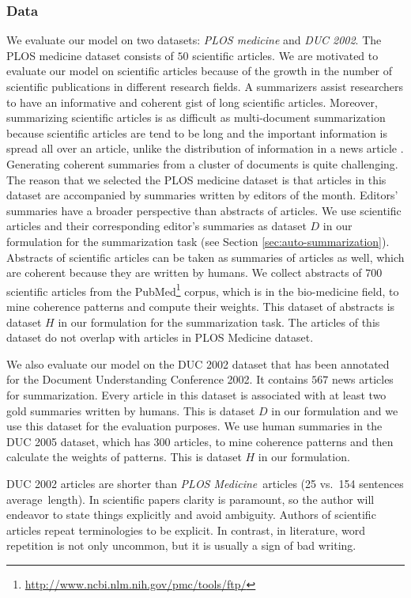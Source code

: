 \subsubsection{Data}
We evaluate our model on two datasets:  \emph{PLOS medicine} and \emph{DUC 2002}. 
The PLOS medicine dataset consists of $50$ scientific articles.  
We are motivated to evaluate our model on scientific articles because of the growth in the number of scientific publications in different research fields.  
A summarizers assist researchers to have an informative and coherent gist of long scientific articles. 
Moreover, summarizing scientific articles is as difficult as multi-document summarization because scientific articles are tend to be long and the important information is spread all over an article,  unlike the distribution of information in a news article \cite{teufel02}. 
Generating coherent summaries from a cluster of documents is quite challenging. 
The reason that we selected the PLOS medicine dataset is that articles in this dataset are accompanied by summaries written by editors of the month. 
Editors' summaries have a broader perspective than abstracts of articles.  
We use scientific articles and their corresponding editor's summaries as dataset $D$ in our formulation for the summarization task (see Section \ref{sec:auto-summarization}). 
Abstracts of scientific articles can be taken as summaries of articles as well, which are coherent because they are written by humans. 
We collect abstracts of $700$ scientific articles from the PubMed\footnote{\url{http://www.ncbi.nlm.nih.gov/pmc/tools/ftp/}} corpus, which is in the \mbox{bio-medicine} field, to mine coherence patterns and compute their weights. 
This dataset of abstracts is dataset $H$ in our formulation for the summarization task.  
The articles of this dataset do not overlap with articles in PLOS Medicine dataset. 

We also evaluate our model on the DUC 2002 dataset that has been annotated for the Document Understanding Conference 2002. 
It contains $567$ news articles for summarization. 
Every article in this dataset is associated with at least two gold summaries written by humans. 
This is dataset $D$ in our formulation and we use this dataset for the evaluation purposes. 
We use human summaries in the DUC 2005 dataset, which has $300$ articles, to mine coherence patterns and then calculate the weights of patterns.  
This is dataset $H$ in our formulation. 

DUC 2002 articles are shorter than \emph{PLOS Medicine}\ articles (25 vs.\ 154 sentences average\ length). 
In scientific papers clarity is paramount, so the author will endeavor to state things explicitly and avoid ambiguity. 
Authors of scientific articles repeat terminologies to be explicit.     
In contrast, in literature, word repetition is not only uncommon, but it is usually a sign of bad writing. 

